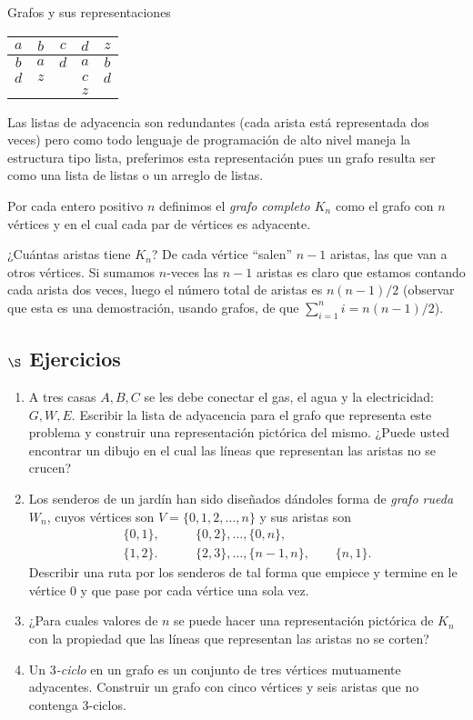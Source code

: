 \begin{section}{Grafos y sus representaciones}
\begin{center}
\begin{tabular}{ccccc}
$a$&$b$&$c$&$d$&$z$ \\ \hline
$b$&$a$&$d$&$a$&$b$ \\
$d$&$z$&&$c$&$d$\\
&&&$z$&
\end{tabular}
\end{center}

Las listas de adyacencia son redundantes (cada arista está representada dos veces) pero como todo lenguaje de programación de alto nivel maneja la estructura tipo lista,  preferimos esta representación pues  un grafo  resulta ser como una lista de listas  o un  arreglo de listas.  


\begin{ejemplo*}
Por cada entero positivo $n$ definimos el \textit{grafo completo   $K_n$} como el grafo con $n$ vértices y en el cual cada par de vértices es adyacente. 

¿Cuántas aristas tiene $K_n$? De cada vértice ``salen'' $n-1$ aristas, las que van a otros vértices. Si  sumamos $n$-veces las $n-1$ aristas es claro que estamos contando cada arista dos veces, luego el número total de aristas es $n(n-1)/2$ (observar que esta es una demostración, usando  grafos, de que $\sum_{i=1}^n i = n(n-1)/2$).
\end{ejemplo*}

\subsection*{$\S$ Ejercicios}
\begin{enumerate}
\item A tres casas $A,B,C$ se les debe conectar el gas, el agua y la electricidad: $G,W,E$. Escribir la lista de adyacencia para el grafo que representa este problema y construir una representación pictórica del mismo. ¿Puede usted encontrar un dibujo en el cual las líneas que representan las aristas no se crucen?
\item Los senderos de un jardín han sido diseñados dándoles forma de \textit{grafo rueda} $W_n$, cuyos vértices son $V=\{0,1,2,\ldots,n\}$ y sus aristas son
$$
\begin{aligned}
\{0,1\},\qquad &\{0,2\},\ldots,\{0,n\}, \\
\{1,2\}.\qquad &\{2,3\},\ldots,\{n-1,n\},\qquad \{n,1\}.
\end{aligned}
$$
Describir una ruta por los senderos de tal forma que empiece y termine en le vértice $0$ y que pase por cada vértice una sola vez. \item  ¿Para cuales valores de $n$ se puede hacer una representación pictórica
de $K_n$ con la propiedad que las líneas que representan las aristas no se corten? 
\item Un \textit{{$3$-ciclo}} en un grafo es un conjunto de tres vértices mutuamente adyacentes. Construir un grafo con cinco vértices y seis aristas que no contenga $3$-ciclos.
\end{enumerate}

\end{section}


